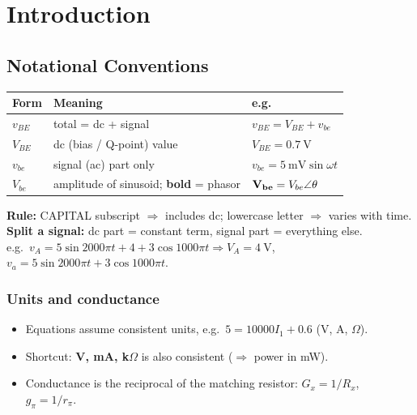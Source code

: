 \section[1]{Introduction}

    \subsection[1.3]{Notational Conventions}
    \begin{tabularx}{\linewidth}{|l|L|l|}
        \hline
        \textbf{Form} & \textbf{Meaning} & \textbf{e.g.} \\ \hline
        $v_{BE}$ & total = dc + signal & $v_{BE} = V_{BE} + v_{be}$ \\ \hline
        $V_{BE}$ & dc (bias / Q-point) value & $V_{BE} = \SI{0.7}{\volt}$ \\ \hline
        $v_{be}$ & signal (ac) part only & $v_{be} = \SI{5}{\milli\volt}\sin\omega t$ \\ \hline
        $V_{be}$ & amplitude of sinusoid; \textbf{bold} = phasor & $\mathbf{V_{be}} = V_{be}\angle\theta$ \\ \hline
    \end{tabularx}
    \textbf{Rule:} CAPITAL subscript $\Rightarrow$ includes dc; lowercase letter $\Rightarrow$ varies with time.\\
    \textbf{Split a signal:} dc part = constant term, signal part = everything else.\\
    e.g.\ $v_A = 5\sin 2000\pi t + 4 + 3\cos 1000\pi t \Rightarrow V_A = \SI{4}{\volt}$, $v_a = 5\sin 2000\pi t + 3\cos 1000\pi t$.

    \subsubsection{Units and conductance}
    \begin{itemize}
        \item Equations assume consistent units, e.g.\ $5 = 10000 I_1 + 0.6$ (V, A, $\Omega$).
        \item Shortcut: \textbf{V, mA, k$\Omega$} is also consistent ($\Rightarrow$ power in mW).
        \item Conductance is the reciprocal of the matching resistor: $G_x = 1/R_x$, \ $g_\pi = 1/r_\pi$.
    \end{itemize}

